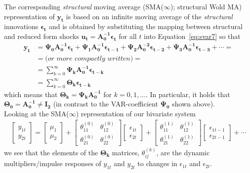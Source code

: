 \documentclass[a4paper,11pt,listof=nochaptergap,oneside,pointednumbers,bibtotoc,bigheadings,liststotoc]{scrbook}
\theoremstyle{mysatz}
\theoremstyle{mydefinition}
\theoremstyle{mytheorem}
\theoremstyle{mybemerkung}
\newcommand{\vect}[1]{\boldsymbol{\mathbf{#1}}}
\begin{document}
The corresponding \textit{structural} moving average (SMA($\infty$); structural Wold MA) representation of $\vect{y_t}$ is based on an infinite moving average of the \textit{structural} innovations $\vect{\epsilon_t}$ and is obtained by substituting the mapping between structural and reduced form shocks $\vect{u_t} = \vect{A_0^{-1}}\vect{\epsilon_t}$ for all $t$ into Equation~\ref{eq:svar7} so that
\begin{equation} \label{eq:svar8}
\begin{split}
 			\vect{y_t} & = \vect{\Psi_0}\vect{A_0^{-1}}\vect{\epsilon_t} + \vect{\Psi_1}\vect{A_0^{-1}}\vect{\epsilon_{t-1}} + \vect{\Psi_{2}}\vect{A_0^{-2}}\vect{\epsilon_{t-2}} + \vect{\Psi_{3}}\vect{A_0^{-1}}\vect{\epsilon_{t-3}} + \cdots = \\
			& = \textit{(or more compactly written)} = \\
			& = \sum\limits_{k=0}^\infty \vect{\Psi_k}\vect{A_0^{-1}}\vect{\epsilon_{t-k}} \\
			& = \sum\limits_{k=0}^\infty \vect{\Theta_k}\vect{\epsilon_{t-k}}
\end{split}								
\end{equation}
which means that $\vect{\Theta_k} = \vect{\Psi_k}\vect{A_0^{-1}}$ for $k = 0, 1, \dots$. In particular, it holds that $\vect{\Theta_0}=\vect{A_0^{-1}} \neq \vect{I_2}$ (in contrast to the VAR-coefficient $\vect{\Psi_0}$ shown above).\\

Looking at the SMA($\infty$) representation of our bivariate system 
\begin{equation} \label{eq:svar9}
\begin{split}
	\begin{bmatrix}
    	y_{1t} \\
    	y_{2t}
 	\end{bmatrix} 
	=
	\begin{bmatrix}
    	\mu_1 \\
    	\mu_2
 	\end{bmatrix} + 
	\begin{bmatrix}
    	\theta_{11}^{(0)} & \theta_{12}^{(0)}\\
    	\theta_{21}^{(0)} & \theta_{22}^{(0)}
 	\end{bmatrix} 
	\begin{bmatrix}
    	\epsilon_{1t} \\
	\epsilon_{2t}
 	\end{bmatrix} + 
	\begin{bmatrix}
    	\theta_{11}^{(1)} & \theta_{12}^{(1)}\\
    	\theta_{21}^{(1)} & \theta_{22}^{(1)}
 	\end{bmatrix} 
	\begin{bmatrix}
    	\epsilon_{1t-1} \\
	\epsilon_{2t-1}
 	\end{bmatrix} + \cdots 
\end{split}								
\end{equation}
we see that the elements of the $\vect{\Theta_k}$ matrices, $\theta_{ij}^{(k)}$, are the dynamic multipliers/impulse responses of $y_{1t}$ and $y_{2t}$ to changes in $\epsilon_{1t}$ and $\epsilon_{2t}$.\\
\end{document}
